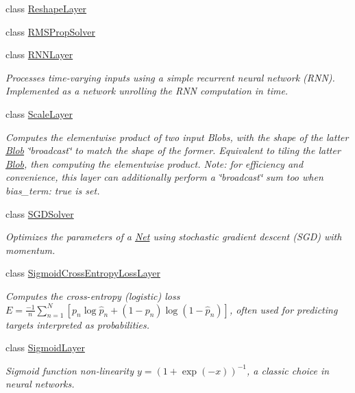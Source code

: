 \begin{DoxyCompactItemize}
class \hyperlink{classcaffe_1_1ReshapeLayer}{Reshape\+Layer}
\item 
class \hyperlink{classcaffe_1_1RMSPropSolver}{R\+M\+S\+Prop\+Solver}
\item 
class \hyperlink{classcaffe_1_1RNNLayer}{R\+N\+N\+Layer}
\begin{DoxyCompactList}\small\item\em Processes time-\/varying inputs using a simple recurrent neural network (R\+NN). Implemented as a network unrolling the R\+NN computation in time. \end{DoxyCompactList}\item 
class \hyperlink{classcaffe_1_1ScaleLayer}{Scale\+Layer}
\begin{DoxyCompactList}\small\item\em Computes the elementwise product of two input Blobs, with the shape of the latter \hyperlink{classcaffe_1_1Blob}{Blob} \char`\"{}broadcast\char`\"{} to match the shape of the former. Equivalent to tiling the latter \hyperlink{classcaffe_1_1Blob}{Blob}, then computing the elementwise product. Note\+: for efficiency and convenience, this layer can additionally perform a \char`\"{}broadcast\char`\"{} sum too when {\ttfamily bias\+\_\+term\+: true} is set. \end{DoxyCompactList}\item 
class \hyperlink{classcaffe_1_1SGDSolver}{S\+G\+D\+Solver}
\begin{DoxyCompactList}\small\item\em Optimizes the parameters of a \hyperlink{classcaffe_1_1Net}{Net} using stochastic gradient descent (S\+GD) with momentum. \end{DoxyCompactList}\item 
class \hyperlink{classcaffe_1_1SigmoidCrossEntropyLossLayer}{Sigmoid\+Cross\+Entropy\+Loss\+Layer}
\begin{DoxyCompactList}\small\item\em Computes the cross-\/entropy (logistic) loss $ E = \frac{-1}{n} \sum\limits_{n=1}^N \left[ p_n \log \hat{p}_n + (1 - p_n) \log(1 - \hat{p}_n) \right] $, often used for predicting targets interpreted as probabilities. \end{DoxyCompactList}\item 
class \hyperlink{classcaffe_1_1SigmoidLayer}{Sigmoid\+Layer}
\begin{DoxyCompactList}\small\item\em Sigmoid function non-\/linearity $ y = (1 + \exp(-x))^{-1} $, a classic choice in neural networks. \end{DoxyCompactList}\item 

\end{DoxyCompactItemize}

